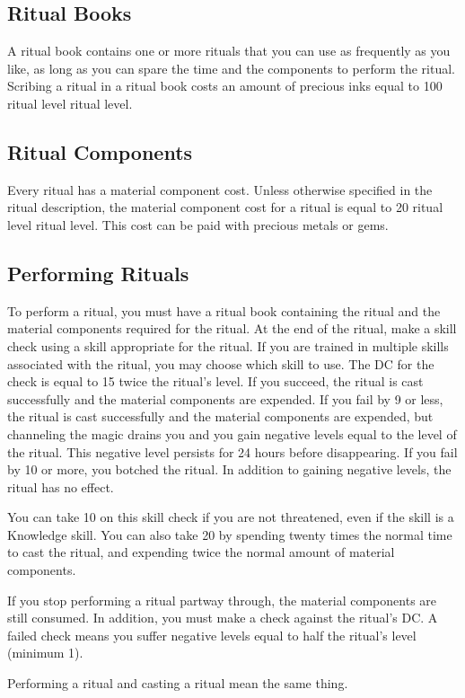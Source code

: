 \subsection{Ritual Books}
A ritual book contains one or more rituals that you can use as frequently as you like, as long as you can spare the time and the components to perform the ritual. Scribing a ritual in a ritual book costs an amount of precious inks equal to 100 \mtimes ritual level \mtimes ritual level.
\subsection{Ritual Components}
Every ritual has a material component cost. Unless otherwise specified in the ritual description, the material component cost for a ritual is equal to 20 \mtimes ritual level \mtimes ritual level. This cost can be paid with precious metals or gems.
\subsection{Performing Rituals}
\par To perform a ritual, you must have a ritual book containing the ritual and the material components required for the ritual. At the end of the ritual, make a skill check using a skill appropriate for the ritual. If you are trained in multiple skills associated with the ritual, you may choose which skill to use. The DC for the check is equal to 15 \add twice the ritual's level. If you succeed, the ritual is cast successfully and the material components are expended. If you fail by 9 or less, the ritual is cast successfully and the material components are expended, but channeling the magic drains you and you gain negative levels equal to the level of the ritual. This negative level persists for 24 hours before disappearing. If you fail by 10 or more, you botched the ritual. In addition to gaining negative levels, the ritual has no effect.
\par You can take 10 on this skill check if you are not threatened, even if the skill is a Knowledge skill. You can also take 20 by spending twenty times the normal time to cast the ritual, and expending twice the normal amount of material components.
\par If you stop performing a ritual partway through, the material components are still consumed. In addition, you must make a check against the ritual's DC. A failed check means you suffer negative levels equal to half the ritual's level (minimum 1).
\par Performing a ritual and casting a ritual mean the same thing.
